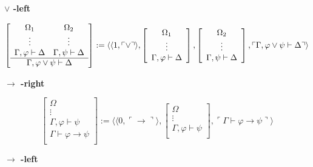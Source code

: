 \vspace{0.5cm}

\textbf{$\vee$ -left}

{\tiny
$$
\left [
\begin{array}{cc}
\Omega_1 & \Omega_{2} \\
\vdots & \vdots\\
\Gamma, \varphi \vdash \Delta & \Gamma, \psi \vdash \Delta\\
\hline
\multicolumn{2}{c}{\Gamma, \varphi \vee \psi \vdash \Delta}\\
\end{array}
\right ]
:= \langle \langle 1,\ulcorner \vee \urcorner \rangle ,
\left [
\begin{array}{c}
\Omega_1\\
\vdots\\
\Gamma,\varphi \vdash \Delta\\
\end{array}
\right ],
\left [
\begin{array}{c}
\Omega_2\\
\vdots\\
\Gamma, \psi \vdash \Delta\\
\end{array}
\right],
\ulcorner \Gamma, \varphi \vee \psi \vdash \Delta \urcorner \rangle
$$}

\vspace{0.5cm}

\textbf{$\rightarrow$ -right}

$$
\left [
\begin{array}{c}
\Omega\\
\vdots\\
\Gamma, \varphi \vdash \psi\\
\hline
\Gamma \vdash \varphi \rightarrow \psi\\
\end{array}
\right ]
:= \langle \langle 0,\ulcorner \rightarrow \urcorner \rangle ,
\left [
\begin{array}{c}
\Omega\\
\vdots\\
\Gamma, \varphi \vdash \psi\\
\end{array}
\right ],
\ulcorner \Gamma \vdash \varphi \rightarrow \psi \urcorner \rangle
$$

\vspace{0.5cm}

\textbf{$\rightarrow$ -left}

